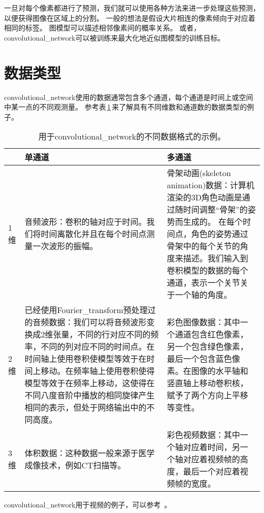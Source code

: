  
一旦对每个像素都进行了预测，我们就可以使用各种方法来进一步处理这些预测，以便获得图像在区域上的分割\citep{Briggman-et-al-NIPS2009,Turaga2010,Farabet-et-al-2013}。
一般的想法是假设大片相连的像素倾向于对应着相同的标签。
图模型可以描述相邻像素间的概率关系。
或者，\gls{convolutional_network}可以被训练来最大化地近似图模型的训练目标\citep{Ning-et-al-2005,Thompson-et-al-NIPS2014}。

\section{数据类型}
\label{sec:data_types}

\gls{convolutional_network}使用的数据通常包含多个通道，每个通道是时间上或空间中某一点的不同观测量。
参考表\,\ref{table:data_types}\,来了解具有不同维数和通道数的数据类型的例子。
 
\begin{table}[htbp!]
\centering
 \begin{tabular}[t]{l|p{}|p{}}
& 单通道 & 多通道\\ \hline
1维 & 
音频波形：卷积的轴对应于时间。我们将时间离散化并且在每个时间点测量一次波形的振幅。 &  
骨架动画(skeleton animation)数据：计算机渲染的3D角色动画是通过随时间调整``骨架''的姿势而生成的。 在每个时间点，角色的姿势通过骨架中的每个关节的角度来描述。我们输入到卷积模型的数据的每个通道，表示一个关节关于一个轴的角度。\\ \hline
2维 & 
已经使用\gls{Fourier_transform}预处理过的音频数据：我们可以将音频波形变换成2维张量，不同的行对应不同的频率，不同的列对应不同的时间点。在时间轴上使用卷积使模型等效于在时间上移动。在频率轴上使用卷积使得模型等效于在频率上移动，这使得在不同八度音阶中播放的相同旋律产生相同的表示，但处于网络输出中的不同高度。 & %
彩色图像数据：其中一个通道包含红色像素，另一个包含绿色像素，最后一个包含蓝色像素。在图像的水平轴和竖直轴上移动卷积核，赋予了两个方向上平移等变性。\\ \hline
3维 &
体积数据：这种数据一般来源于医学成像技术，例如CT扫描等。 & 
彩色视频数据：其中一个轴对应着时间，另一个轴对应着视频帧的高度，最后一个对应着视频帧的宽度。\\
\end{tabular}
\caption{用于\gls{convolutional_network}的不同数据格式的示例。}
\label{table:data_types}
\end{table}
 
\gls{convolutional_network}用于视频的例子，可以参考~\cite{Chen-Ting-2010}。

